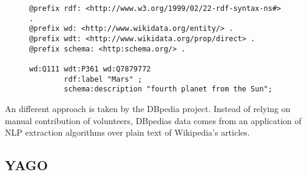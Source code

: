 \begin{figure}[h]
\begin{lstlisting}[language = Turtle, caption={Wikidata content sample (Source: author)}, label={wikidataexample},captionpos=b escapeinside={(*@}{@*)}]
@prefix rdf: <http://www.w3.org/1999/02/22-rdf-syntax-ns#> .
@prefix wd: <http://www.wikidata.org/entity/> .
@prefix wdt: <http://www.wikidata.org/prop/direct> .
@prefix schema: <http:schema.org/> .

wd:Q111 wdt:P361 wd:Q7879772
        rdf:label "Mars" ;
        schema:description "fourth planet from the Sun";
\end{lstlisting}
\end{figure}

An different approach is taken by the DBpedia project. Instead of relying on manual contribution of volunteers, DBpedias data comes from an application of NLP extraction algorithms over plain text of Wikipedia's articles. 



\cite{gdpr162_2020}


\subsection{YAGO}














